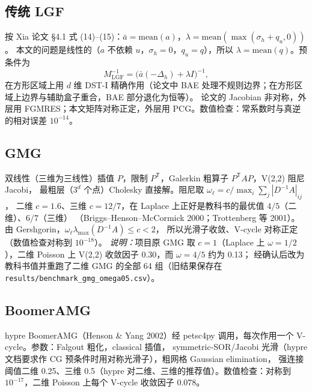 \documentclass[11pt,a4paper]{ctexart}
\begin{document}
\subsection{传统 LGF}
按 Xia 论文 §4.1 式 (14)--(15)：$\bar a=\mathrm{mean}(a)$，$\lambda=\mathrm{mean}(\max(\sigma_h+q_u,0))$。
本文的问题是线性的（$a$ 不依赖 $u$，$\sigma_h=0$，$q_u=q$），所以 $\lambda=\mathrm{mean}(q)$。预条件为
\[
  M_{\mathrm{LGF}}^{-1}=\big(\bar a(-\Delta_h)+\lambda I\big)^{-1},
\]
在方形区域上用 $d$ 维 DST-I 精确作用（论文中 BAE 处理不规则边界；在方形区域上边界与辅助盒子重合，BAE 部分退化为恒等）。
论文的 Jacobian 非对称，外层用 FGMRES；本文矩阵对称正定，外层用 PCG。数值检查：常系数时与真逆的相对误差 $10^{-14}$。

\subsection{GMG}
双线性（三维为三线性）插值 $P$，限制 $P^{\mathsf T}$，Galerkin 粗算子 $P^{\mathsf T}AP$，V(2,2) 阻尼 Jacobi，
最粗层（$3^d$ 个点）Cholesky 直接解。阻尼取 $\omega_\ell=c/\max_i\sum_j|D^{-1}A|_{ij}$，
二维 $c=1.6$、三维 $c=12/7$，在 Laplace 上正好是教科书的最优值 $4/5$（二维）、$6/7$（三维）
（Briggs--Henson--McCormick 2000；Trottenberg 等 2001）。由 Gershgorin，$\omega_\ell\lambda_{\max}(D^{-1}A)\le c<2$，
所以光滑子收敛、V-cycle 对称正定（数值检查对称到 $10^{-18}$）。
\emph{说明：}项目原 GMG 取 $c=1$（Laplace 上 $\omega=1/2$），二维 Poisson 上 V(2,2) 收敛因子 0.30，而 $\omega=4/5$ 约为 0.13；
经确认后改为教科书值并重跑了二维 GMG 的全部 64 组（旧结果保存在 \texttt{results/benchmark\_gmg\_omega05.csv}）。

\subsection{BoomerAMG}
hypre BoomerAMG（Henson \& Yang 2002）经 petsc4py 调用，每次作用一个 V-cycle。参数：Falgout 粗化，classical 插值，
symmetric-SOR/Jacobi 光滑（hypre 文档要求作 CG 预条件时用对称光滑子），粗网格 Gaussian elimination，
强连接阈值二维 0.25、三维 0.5（hypre 对二维、三维的推荐值）。数值检查：对称到 $10^{-17}$，二维 Poisson 上每个 V-cycle 收敛因子 0.078。
\end{document}
